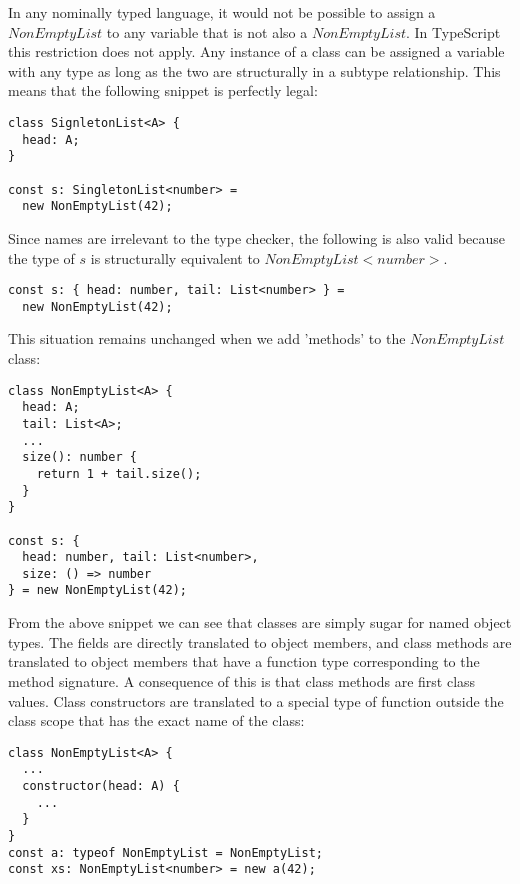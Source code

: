 In any nominally typed language, it would not be possible to assign a $NonEmptyList$ to any variable that is not also a $NonEmptyList$.
In TypeScript this restriction does not apply. 
Any instance of a class can be assigned a variable with any type as long as the two are structurally in a subtype relationship.
This means that the following snippet is perfectly legal:

\begin{lstlisting}
class SignletonList<A> {
  head: A;
}

const s: SingletonList<number> = 
  new NonEmptyList(42);
\end{lstlisting}

Since names are irrelevant to the type checker, the following is also valid because the type of 
$s$ is structurally equivalent to $NonEmptyList<number>$.
\bigskip
\begin{lstlisting}
const s: { head: number, tail: List<number> } =
  new NonEmptyList(42);
\end{lstlisting}

This situation remains unchanged when we add 'methods' to the $NonEmptyList$ class:

\begin{lstlisting}
class NonEmptyList<A> {
  head: A;
  tail: List<A>;
  ...
  size(): number {
    return 1 + tail.size();
  }
}

const s: { 
  head: number, tail: List<number>,
  size: () => number  
} = new NonEmptyList(42);
\end{lstlisting}

From the above snippet we can see that classes are simply sugar for named object types.
The fields are directly translated to object members, and class methods are translated
to object members that have a function type corresponding to the method signature.
A consequence of this is that class methods are first class values.
Class constructors are translated to a special type of function outside the class scope that has the exact name of the class:

\begin{lstlisting}
class NonEmptyList<A> {
  ...
  constructor(head: A) {
    ...
  }
}
const a: typeof NonEmptyList = NonEmptyList;
const xs: NonEmptyList<number> = new a(42);
\end{lstlisting}

